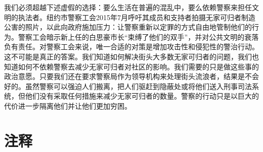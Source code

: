 \documentclass[fontset=fandol, a4paper, 12pt, openright]{ctexbook}
\begin{document}
我们必须超越下述虚假的选择：要么生活在普遍的混乱中，要么依赖警察来担任文明的执法者。纽约市警察工会2015年7月呼吁其成员和支持者拍摄无家可归者制造公害的照片，以此向政府施加压力：让警察重新以定罪的方式自由地管制他们的行为。警察工会暗示新上任的白思豪市长“束缚了他们的双手”，并对公共文明的衰落负有责任。对警察工会来说，唯一合适的对策是增加攻击性和侵犯性的警治行动。这不可能是真正的答案。我们知道如何解决街头大多数无家可归者的问题，我们也知道如何不依赖警察去减少无家可归者对社区的影响。我们需要的只是做这些事的政治意愿。只要我们还在要求警察局作为领导机构来处理街头流浪者，结果是不会好的。虽然警察可以强迫人们搬离，把人们驱赶到隐蔽处或将他们送入刑事司法系统，但他们没有采取任何措施来减少无家可归者的数量。警察的行动只是以巨大的代价进一步隔离他们并让他们更加穷困。

\section*{注释}
\end{document}

